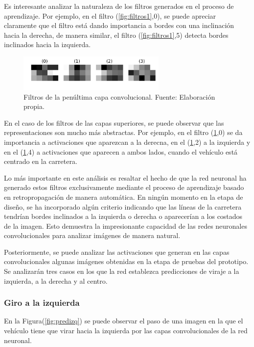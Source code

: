     Es interesante analizar la naturaleza de los filtros generados en el proceso de aprendizaje. Por ejemplo, en el filtro 
    (\ref{fig:filtros1},0), se puede apreciar claramente que el filtro está dando importancia a bordes con una inclinación 
    hacia la derecha, de manera similar, el filtro (\ref{fig:filtros1},5) detecta bordes inclinados hacia la izquierda.

    
    \begin{figure}[!h] 
        \centering
        \includegraphics[width=0.65\textwidth]{img/filtros7}
        \caption[Filtros de la penúltima capa convolucional]{Filtros de la penúltima capa convolucional. Fuente: Elaboración propia. }
        \label{fig:filtros7}
    \end{figure}

    En el caso de los filtros de las capas superiores, se puede observar que las representaciones son mucho más abstractas. Por 
    ejemplo, en el filtro (\ref{fig:filtros7},0) se da importancia a activaciones que aparezcan a la derecna, en el 
    (\ref{fig:filtros7},2) a la izquierda y en el (\ref{fig:filtros7},4) a activaciones que aparecen a ambos lados, cuando 
    el vehículo está centrado en la carretera.

    Lo más importante en este análisis es resaltar el hecho de que la red neuronal ha generado estos filtros exclusivamente 
    mediante el proceso de aprendizaje basado en retropropagación de manera automática. En ningún momento en la etapa de diseño, 
    se ha incorporado algún criterio indicando que las líneas de la carretera tendrían bordes inclinados a la izquierda o derecha 
    o aparecerían a los costados de la imagen. Esto demuestra la impresionante capacidad de las redes neuronales convolucionales 
    para analizar imágenes de manera natural.

    Posteriormente, se puede analizar las activaciones que generan en las capas convolucionales algunas imágenes obtenidas 
    en la etapa de pruebas del prototipo. Se analizarán tres casos en los que la red establezca predicciones de 
    viraje a la izquierda, a la derecha y al centro.

        \subsubsection{Giro a la izquierda}
        En la Figura(\ref{fig:predizq}) se puede observar el paso de una imagen en la que el vehículo tiene que virar hacia la izquierda por 
        las capas convolucionales de la red neuronal. 

